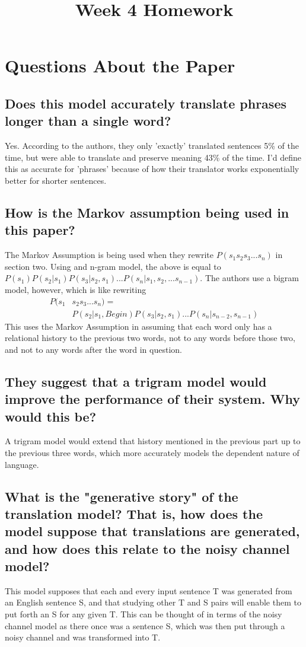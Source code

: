\documentclass{article}
\title{Week 4 Homework}
\begin{document}
 

\section{Questions About the Paper}
\subsection{Does this model accurately translate phrases longer than a single word?}
Yes. According to the authors, they only 'exactly' translated sentences 5\% of the time, but were able to translate and preserve meaning 43\% of the time. I'd define this as accurate for 'phrases' because of how their translator works exponentially better for shorter sentences.

\subsection{How is the Markov assumption being used in this paper?}
The Markov Assumption is being used when they rewrite $P(s_1 s_2 s_3  ...  s_n)$ in section two. Using and n-gram model, the above is equal to $P(s_1)P(s_2|s_1)P(s_3|s_2,s_1)...P(s_n|s_1,s_2,...s_{n-1})$. The authors use a bigram model, however, which is like rewriting
\begin{align*}
P(s_1 & s_2 s_3  ...  s_n) = \\
&P(s_2|s_1,Begin)P(s_3|s_2,s_1) ... P(s_n|s_{n-2},s_{n-1})
\end{align*}
This uses the Markov Assumption in assuming that each word only has a relational history to the previous two words, not to any words before those two, and not to any words after the word in question.

\subsection{They suggest that a trigram model would improve the performance of their system. Why would this be?}
A trigram model would extend that history mentioned in the previous part up to the previous three words, which more accurately models the dependent nature of language. 

\subsection{What is the "generative story" of the translation model? That is, how does the model suppose that translations are generated, and how does this relate to the noisy channel model?}
This model supposes that each and every input sentence T was generated from an English sentence S, and that studying other T and S pairs will enable them to put forth an S for any given T. This can be thought of in terms of the noisy channel model as there once was a sentence S, which was then put through a noisy channel and was transformed into T. 
\end{document}
